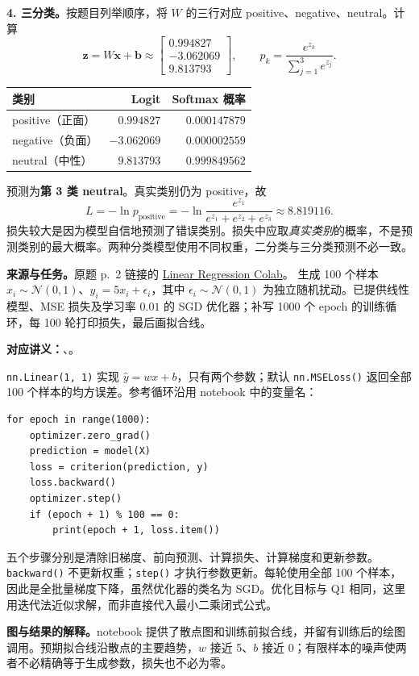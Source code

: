 \begin{checkedsolution}
\textbf{4. 三分类。}按题目列举顺序，将 $W$ 的三行对应 positive、negative、neutral。计算
\[
 \mathbf z=W\mathbf x+\mathbf b\approx
 \begin{bmatrix}0.994827\\-3.062069\\9.813793\end{bmatrix},\qquad
 p_k=\frac{e^{z_k}}{\sum_{j=1}^{3}e^{z_j}}.
\]
\begin{center}
\begin{tabular}{@{}lrr@{}}
\toprule
类别 & Logit & Softmax 概率 \\
\midrule
positive（正面） & $0.994827$ & $0.000147879$ \\
negative（负面） & $-3.062069$ & $0.000002559$ \\
neutral（中性） & $9.813793$ & $0.999849562$ \\
\bottomrule
\end{tabular}
\end{center}
预测为\textbf{第 3 类 neutral}。真实类别仍为 positive，故
\[
 \boxed{L=-\ln p_{\mathrm{positive}}
 =-\ln\frac{e^{z_1}}{e^{z_1}+e^{z_2}+e^{z_3}}
 \approx8.819116.}
\]
损失较大是因为模型自信地预测了错误类别。损失中应取\emph{真实类别}的概率，不是预测类别的最大概率。两种分类模型使用不同权重，二分类与三分类预测不必一致。
\end{checkedsolution}

\nopagebreak[4]

\textbf{来源与任务。}原题 p.~2 链接的
\href{https://colab.research.google.com/drive/1KeYjOo36ABjbc-dX1pfJyVyFUQX50dff?usp=sharing}{Linear Regression Colab}。
生成 100 个样本 $x_i\sim\mathcal N(0,1)$、$y_i=5x_i+\epsilon_i$，其中 $\epsilon_i\sim\mathcal N(0,1)$ 为独立随机扰动。已提供线性模型、MSE 损失及学习率 $0.01$ 的 SGD 优化器；补写 1000 个 epoch 的训练循环，每 100 轮打印损失，最后画拟合线。

\textbf{对应讲义：}、。

\begin{checkedsolution}
\texttt{nn.Linear(1, 1)} 实现 $\hat y=wx+b$，只有两个参数；默认 \texttt{nn.MSELoss()} 返回全部 100 个样本的均方误差。参考循环沿用 notebook 中的变量名：
\begingroup\small\linespread{1.05}\selectfont
\begin{verbatim}
for epoch in range(1000):
    optimizer.zero_grad()
    prediction = model(X)
    loss = criterion(prediction, y)
    loss.backward()
    optimizer.step()
    if (epoch + 1) % 100 == 0:
        print(epoch + 1, loss.item())
\end{verbatim}
\endgroup
五个步骤分别是清除旧梯度、前向预测、计算损失、计算梯度和更新参数。\texttt{backward()} 不更新权重；\texttt{step()} 才执行参数更新。每轮使用全部 100 个样本，因此是全批量梯度下降，虽然优化器的类名为 SGD。优化目标与 Q1 相同，这里用迭代法近似求解，而非直接代入最小二乘闭式公式。

\textbf{图与结果的解释。}notebook 提供了散点图和训练前拟合线，并留有训练后的绘图调用。预期拟合线沿散点的主要趋势，$w$ 接近 5、$b$ 接近 0；有限样本的噪声使两者不必精确等于生成参数，损失也不必为零。
\end{checkedsolution}

